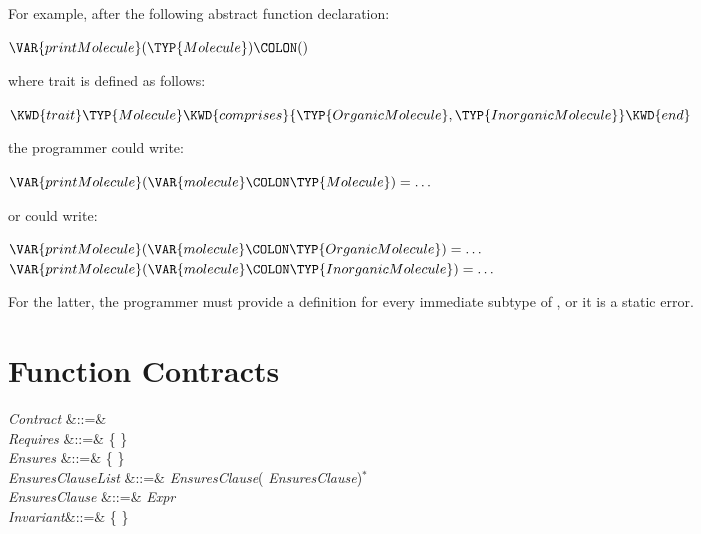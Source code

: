 For example, after the following abstract function declaration:
\begin{Fortress}
\(\VAR{printMolecule}(\TYP{Molecule})\COLON ()\)
\end{Fortress}
where trait  is defined as follows:
\begin{Fortress}
\(\KWD{trait} \TYP{Molecule} \KWD{comprises} \{\TYP{OrganicMolecule}, \TYP{InorganicMolecule}\} \KWD{end}\)
\end{Fortress}
the programmer could write:
\begin{Fortress}
\(\VAR{printMolecule}(\VAR{molecule}\COLON \TYP{Molecule}) = \ldots\)
\end{Fortress}
or could write:
\begin{Fortress}
\(\VAR{printMolecule}(\VAR{molecule}\COLON \TYP{OrganicMolecule}) = \ldots\)\\
\(\VAR{printMolecule}(\VAR{molecule}\COLON \TYP{InorganicMolecule}) = \ldots\)
\end{Fortress}
For the latter, the programmer must provide a
definition for every immediate subtype of , or
it is a static error.

\section{Function Contracts}

\begin{Grammar}
\emph{Contract} &::=&   \\

\emph{Requires} &::=&
 \{  \} \\

\emph{Ensures}  &::=&
 \{  \} \\

\emph{EnsuresClauseList} &::=&
\emph{EnsuresClause}(\EXP{,} \emph{EnsuresClause})$^*$ \\

\emph{EnsuresClause} &::=& \emph{Expr}  \\

\emph{Invariant}&::=&
 \{  \} \\

\end{Grammar}

